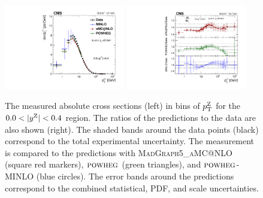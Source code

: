 \begin{figure}
	\centering
	\includegraphics[width=0.47\textwidth]{figures/zpt/zll_double_rap0.pdf}
        \includegraphics[width=0.47\textwidth]{figures/zpt/zll_double_ratio_rap0.pdf}
	\caption{The measured absolute cross sections (left) in bins of $p_{\mathrm{T}}^{\mathrm{Z}}$ for the $0.0 < |y^{\mathrm{Z}}| < 0.4$ region. The ratios of the predictions to the data are also shown (right). The shaded bands around the data points (black) correspond to the total experimental uncertainty. The measurement is compared to the predictions with \textsc{MadGraph5\_aMC@NLO} (square red markers),  ${\textsc{powheg}}$ (green triangles), and ${\textsc{powheg}}$-\textsc{MINLO} (blue circles). The error bands around the predictions correspond to the combined statistical, PDF, and scale uncertainties.}
	\label{fig:zll_double0}
\end{figure}

